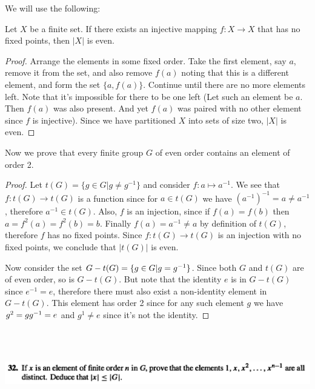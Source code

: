 We will use the following:

\begin{lemma}
  Let $X$ be a finite set. If there exists an injective mapping $f: X \to X$ that has no fixed
  points, then $|X|$ is even.
\end{lemma}

\begin{proof}
  Arrange the elements in some fixed order. Take the first element, say $a$, remove it from the
  set, and also remove $f(a)$ noting that this is a different element, and form the
  set $\{a, f(a)\}$. Continue until there are no more elements left. Note that it's impossible for
  there to be one left (Let such an element be $a$. Then $f(a)$ was also present. And yet $f(a)$
  was paired with no other element since $f$ is injective). Since we have partitioned $X$ into sets
  of size two, $|X|$ is even.
\end{proof}

Now we prove that every finite group $G$ of even order contains an element of order 2.

\begin{proof}
  Let $t(G) = \{g \in G | g \neq g^{-1}\}$ and consider $f: a \mapsto a^{-1}$. We see
  that $f: t(G) \to t(G)$ is a function since for $a \in t(G)$ we have
  $(a^{-1})^{-1} = a \neq a^{-1}$, therefore $a^{-1} \in t(G)$. Also, $f$ is an injection, since
  if $f(a) = f(b)$ then $a = f^2(a) = f^2(b) = b$. Finally $f(a) = a^{-1} \neq a$ by definition
  of $t(G)$, therefore $f$ has no fixed points. Since $f: t(G) \to t(G)$ is an injection with no
  fixed points, we conclude that $|t(G)|$ is even.

  Now consider the set $G - t(G) = \{g \in G | g = g^{-1}\}$. Since both $G$ and $t(G)$ are of even
  order, so is $G - t(G)$. But note that the identity $e$ is in $G - t(G)$ since $e^{-1} = e$,
  therefore there must also exist a non-identity element in $G - t(G)$. This element has order 2
  since for any such element $g$ we have $g^2 = gg^{-1} = e$ and $g^1 \neq e$ since it's not the identity.
\end{proof}




~\\~\\
\begin{mdframed}
\includegraphics[width=400pt]{img/algebra--nf--1--problem-set-1-a008.png}
\end{mdframed}

